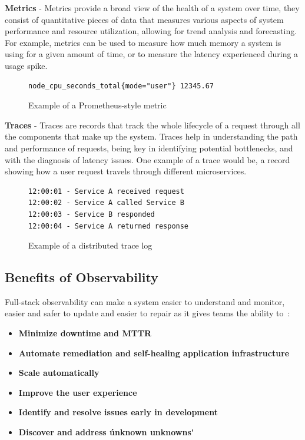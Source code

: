 \textbf{Metrics} - Metrics provide a broad view of the health of a system over time, they consist of quantitative
pieces
of data that
measures various aspects of system performance and resource utilization, allowing for trend analysis and forecasting.
For example, metrics can be used to measure how much memory a system is using for a given amount of time, or to
measure the latency experienced during a usage spike.\\
\begin{figure}[h]
    \centering
    \begin{lstlisting}
node_cpu_seconds_total{mode="user"} 12345.67
    \end{lstlisting}
    \caption{Example of a Prometheus-style metric}
\end{figure}


\textbf{Traces} - Traces are records that track the whole lifecycle of a request through all the components that
make up
the system.
Traces help in understanding the path and performance of requests, being key in identifying potential bottlenecks,
and with the diagnosis of latency issues.
One example of a trace would be, a record showing how a user request travels through different microservices.\\
\begin{figure}[h]
    \centering
    \begin{lstlisting}
12:00:01 - Service A received request
12:00:02 - Service A called Service B
12:00:03 - Service B responded
12:00:04 - Service A returned response
    \end{lstlisting}
    \caption{Example of a distributed trace log}
\end{figure}


\subsection{Benefits of Observability}\label{subsec:benefits-of-observability}

Full-stack observability can make a system easier to understand and monitor, easier and safer to update and easier 
to repair as it gives teams the ability to~\cite{ibm_observability}:

\begin{itemize}
    \item   \textbf{Minimize downtime and \ac{MTTR}}
    \item   \textbf{Automate remediation and self-healing application infrastructure}
    \item   \textbf{Scale automatically}
    \item   \textbf{Improve the user experience}
    \item   \textbf{Identify and resolve issues early in development}
    \item   \textbf{Discover and address \'unknown unknowns\'}
\end{itemize}
